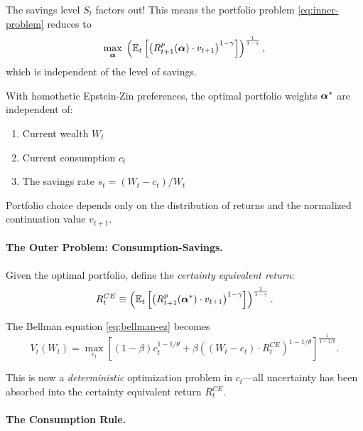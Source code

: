 The savings level $S_t$ factors out! This means the portfolio problem \eqref{eq:inner-problem} reduces to
\begin{equation}
\max_{\boldsymbol{\alpha}} \; \left( \mathbb{E}_t\left[ \left( R_{t+1}^p(\boldsymbol{\alpha}) \cdot v_{t+1} \right)^{1-\gamma} \right] \right)^{\frac{1}{1-\gamma}},
\label{eq:portfolio-problem-reduced}
\end{equation}
which is independent of the level of savings.

\begin{proposition}
\label{prop:portfolio-separation}
With homothetic Epstein-Zin preferences, the optimal portfolio weights $\boldsymbol{\alpha}^{*}$ are independent of:
\begin{enumerate}[label=(\roman*), nosep]
    \item Current wealth $W_t$
    \item Current consumption $c_t$
    \item The savings rate $s_t = (W_t - c_t)/W_t$
\end{enumerate}
Portfolio choice depends only on the distribution of returns and the normalized continuation value $v_{t+1}$.
\end{proposition}

\paragraph{The Outer Problem: Consumption-Savings.}

Given the optimal portfolio, define the \emph{certainty equivalent return}:
\begin{equation}
R_t^{CE} \equiv \left( \mathbb{E}_t\left[ \left( R_{t+1}^p(\boldsymbol{\alpha}^{*}) \cdot v_{t+1} \right)^{1-\gamma} \right] \right)^{\frac{1}{1-\gamma}}.
\label{eq:ce-return}
\end{equation}

The Bellman equation \eqref{eq:bellman-ez} becomes
\begin{equation}
V_t(W_t) = \max_{c_t} \left[ (1-\beta) c_t^{1-1/\theta} + \beta \left( (W_t - c_t) \cdot R_t^{CE} \right)^{1-1/\theta} \right]^{\frac{1}{1-1/\theta}}.
\label{eq:outer-problem}
\end{equation}

This is now a \emph{deterministic} optimization problem in $c_t$---all uncertainty has been absorbed into the certainty equivalent return $R_t^{CE}$.

\paragraph{The Consumption Rule.}

